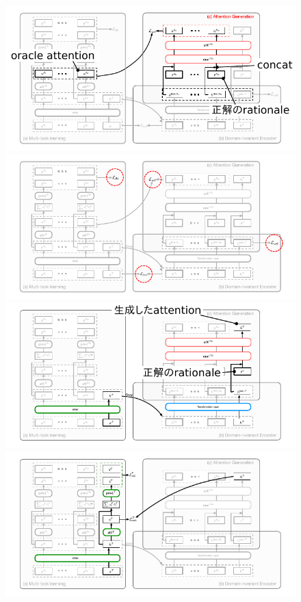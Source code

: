\begin{frame}
\begin{figure}
\begin{overprint}
    \includegraphics{fig/proposed_c.pdf}%
    \includegraphics{fig/proposed_d.pdf}%
    \includegraphics{fig/proposed_e.pdf}%
    \includegraphics{fig/proposed_f.pdf}%
    \end{overprint}
\end{figure}
\end{frame}



